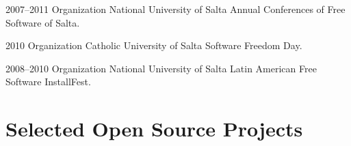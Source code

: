 \documentclass[11pt,a4paper]{moderncv}
\begin{document}
        \cventry                                                                 %
            {2007--2011}                                                         %
            {Organization}                                                       %
            {National University of Salta}                                       %
            {}                                                                   %
            {Annual Conferences of Free Software of Salta.}                      %
            {}                                                                   %

        \cventry                                                                 %
            {2010}                                                               %
            {Organization}                                                       %
            {Catholic University of Salta}                                       %
            {}                                                                   %
            {Software Freedom Day.}                                              %
            {}                                                                   %

        \cventry                                                                 %
            {2008--2010}                                                         %
            {Organization}                                                       %
            {National University of Salta}                                       %
            {}                                                                   %
            {Latin American Free Software InstallFest.}                          %
            {}                                                                   %

\section{Selected Open Source Projects}

\end{document}
